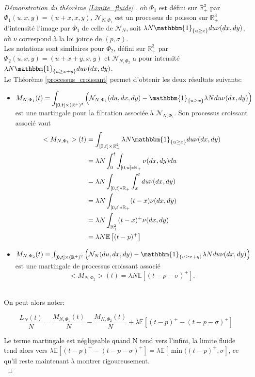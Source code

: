 \documentclass[12pt,a4paper]{article}
\newcommand{\E}[1]{\mathbb{E}\left[ #1 \right]}
\newcommand{\R}{\mathbb{R}}
\newcommand{\1}[1]{\mathbbm{1}_{\{#1\}} }
\theoremstyle{definition}
\begin{document}
{\begin{proof}[Démonstration du théorème \ref{Limite_fluide} ]
où $\Phi_1$ est défini sur $\R_+^3$ par $\Phi_1(u,x,y) = (u+x,x,y)$, $\mathcal{N}_{N,\Phi_1}$  est un processus de poisson sur $\R_+^3$ d'intensité l'image par $\Phi_1$ de celle de $\mathcal{N}_N$, soit $\lambda N \1{u\geq x}du\nu(dx,dy)$, où $\nu$ correspond à la loi jointe de $(p,\sigma)$.\\
Les notations sont similaires pour $\Phi_2$, défini sur $\R_+^3$ par $\Phi_2(u,x,y) = (u+x+y,x,y)$ et $\mathcal{N}_{N,\Phi_2}$ a pour intensité $\lambda N \1{u\geq x+y}du\nu(dx,dy)$.\\


Le Théorème \ref{processus_croissant} permet d'obtenir les deux résultats suivants:


\begin{itemize}

\item $\displaystyle M_{N,\Phi_1}(t) = \int_{[0,t]\times (\R^+)^2}  \left(\mathcal{N}_{N,\Phi_1}(du,dx,dy)-\1{u\geq x}\lambda N du \nu(dx,dy)\right)$ est une martingale pour la filtration associée à $\mathcal{N}_{N,\Phi_1}$. Son processus croissant associé vaut\\
  
\begin{align*}
<M_{N,\Phi_1}>(t) &= \int_{[0,t]\times \R_+^2}\lambda N \1{u\geq x}du\nu(dx,dy)\\
&= \lambda N \int_0^t\int_{[0,u]*\R_+}\nu(dx,dy) du\\
&= \lambda N \int_{[0,t]*\R_+}\int_x^t du \nu(dx,dy)\\
&= \lambda N \int_{[0,t]*\R_+}(t-x) \nu(dx,dy)\\
&= \lambda N \int_{\R_+^2}(t-x)^+ \nu(dx,dy)\\
&= \lambda N \E{(t-p)^+}
\end{align*}  
  
  
\item  $M_{N,\Phi_2}(t) = \int_{[0,t]\times (\R^+)^2}  \left(\mathcal{N}_N(du,dx,dy)-\1{u\geq x+y }\lambda N du \nu(dx,dy)\right)$ est une martingale de processus croissant associé \\
$$<M_{N,\Phi_2}>(t) = \lambda N \E{(t-p-\sigma)^+}.$$\\
\end{itemize}
On peut alors noter:

$$\frac{L_N(t)}{N} = \frac{M_{N,\Phi_1}(t)}{N} - \frac{M_{N,\Phi_2}(t)}{N} + \lambda  \E{(t-p)^+-(t-p-\sigma)^+}$$

Le terme martingale est négligeable quand N tend vers l'infini, la limite fluide tend alors vers $\lambda  \E{(t-p)^+-(t-p-\sigma)^+} = \lambda  \E{\min((t-p)^+,\sigma}$, ce qu'il reste maintenant à montrer rigoureusement.
\\
\medskip


\end{proof}}
\end{document}
